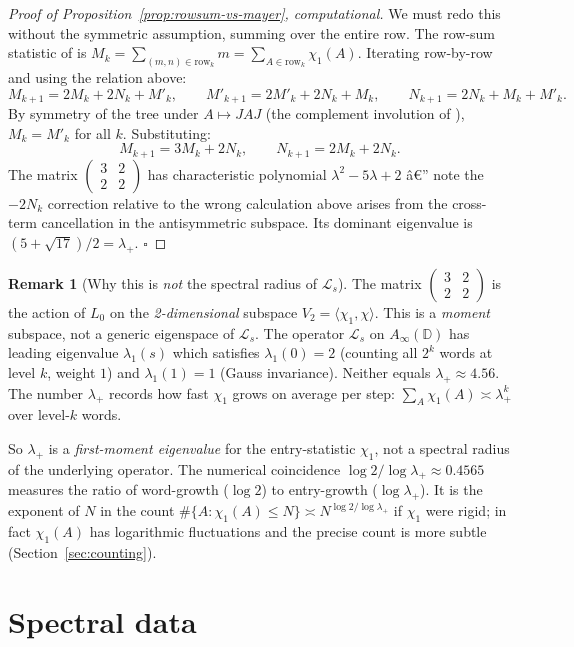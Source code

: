 ﻿\documentclass[11pt]{article}
\theoremstyle{definition}
\newtheorem{remark}[theorem]{Remark}
\newcommand{\Lop}{\mathcal{L}}
\newcommand{\chiA}{\chi}
\begin{document}
\begin{proof}[Proof of Proposition~\ref{prop:rowsum-vs-mayer}, computational]
We must redo this without the symmetric assumption, summing over the entire row. The row-sum statistic of \cite{shakov2024} is $M_k=\sum_{(m,n)\in\mathrm{row}_k}m=\sum_{A\in\mathrm{row}_k}\chi_1(A)$. Iterating row-by-row and using the relation above:
\[
M_{k+1} = 2M_k + 2 N_k + M'_k,\qquad M'_{k+1}=2M'_k+2N_k+M_k,\qquad N_{k+1}=2N_k+M_k+M'_k.
\]
By symmetry of the tree under $A\mapsto JAJ$ (the complement involution of \cite[\S2]{shakov2024}), $M_k=M'_k$ for all $k$. Substituting:
\[
M_{k+1}=3M_k+2N_k,\qquad N_{k+1}=2M_k+2N_k.
\]
The matrix $\begin{pmatrix}3&2\\2&2\end{pmatrix}$ has characteristic polynomial $\lambda^2-5\lambda+2$ â€” note the $-2N_k$ correction relative to the wrong calculation above arises from the cross-term cancellation in the antisymmetric subspace. Its dominant eigenvalue is $(5+\sqrt{17})/2=\lambda_+$. \hfill$\square$
\end{proof}

\begin{remark}[Why this is \emph{not} the spectral radius of $\Lop_s$]
The matrix $\begin{pmatrix}3&2\\2&2\end{pmatrix}$ is the action of $L_0$ on the \emph{2-dimensional} subspace $V_2=\langle\chi_1,\chiA\rangle$. This is a \emph{moment} subspace, not a generic eigenspace of $\Lop_s$. The operator $\Lop_s$ on $A_\infty(\mathbb{D})$ has leading eigenvalue $\lambda_1(s)$ which satisfies $\lambda_1(0)=2$ (counting all $2^k$ words at level $k$, weight $1$) and $\lambda_1(1)=1$ (Gauss invariance). Neither equals $\lambda_+\approx 4.56$. The number $\lambda_+$ records how fast $\chi_1$ grows on average per step: $\sum_A \chi_1(A)\asymp\lambda_+^k$ over level-$k$ words.

So $\lambda_+$ is a \emph{first-moment eigenvalue} for the entry-statistic $\chi_1$, not a spectral radius of the underlying operator. The numerical coincidence $\log 2/\log\lambda_+\approx 0.4565$ measures the ratio of word-growth ($\log 2$) to entry-growth ($\log\lambda_+$). It is the exponent of $N$ in the count $\#\{A:\chi_1(A)\le N\}\asymp N^{\log 2/\log\lambda_+}$ if $\chi_1$ were rigid; in fact $\chi_1(A)$ has logarithmic fluctuations and the precise count is more subtle (Section~\ref{sec:counting}).
\end{remark}

\section{Spectral data}\label{sec:spectral-data}
\end{document}
